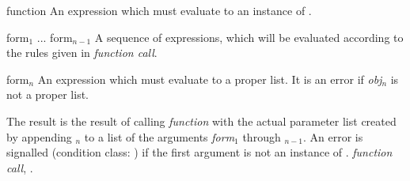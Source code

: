 \begin{optDefinition}
%
\Syntax
{}%
%
\begin{arguments}
    \item[function] An expression which must evaluate to an instance of
    .

    \item[form$_1$ ... form$_{n-1}$] A sequence of expressions, which will be
    evaluated according to the rules given in {\em function call}.

    \item[form$_n$] An expression which must evaluate to a proper list.  It is
    an error if {\em obj$_n$} is not a proper list.
\end{arguments}
%
\result%
The result is the result of calling {\em function} with the actual parameter
list created by appending $_n$ to a list of the arguments {\em
    form}$_1$ through $_{n-1}$.  An error is signalled (condition
class: ) if the
first argument is not an instance of .
%
\seealso%
{\em function call}, .
\end{optDefinition}


